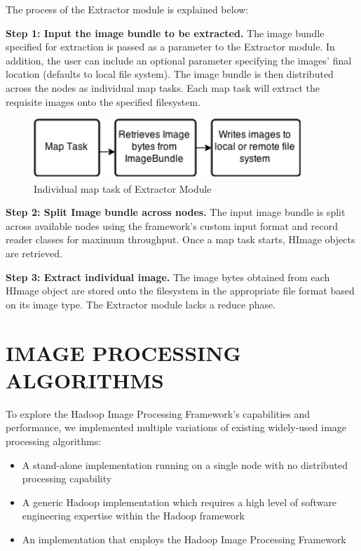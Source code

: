 \documentclass{osuthesis}
\begin{document}
				The process of the Extractor module is explained below:
				
				\textbf{Step 1: Input the image bundle to be extracted.} The image
				bundle specified for extraction is passed as a parameter to the
				Extractor module.  In addition, the user can include an optional
				parameter specifying the images' final location (defaults to local
				file system).  The image bundle is then distributed across the nodes
				as individual map tasks. Each map task will extract the requisite
				images onto the specified filesystem.
				
				\begin{figure}[h]
					\centering
					\includegraphics[width=0.90\textwidth]{ext-map}
					\caption{Individual map task of Extractor Module}
					\label{fig:ext-map}
				\end{figure}
				
				\textbf{Step 2: Split Image bundle across nodes.} The input image
				bundle is split across available nodes using the framework's custom
				input format and record reader classes for maximum throughput. Once a
				map task starts, HImage objects are retrieved.
				
				\textbf{Step 3: Extract individual image.} The image bytes obtained
				from each HImage object are stored onto the filesystem in the
				appropriate file format based on its image type.  The Extractor module
				lacks a reduce phase.
				
				
				
				\chapter{IMAGE PROCESSING ALGORITHMS}
				\label{algorithms}
				To explore the Hadoop Image Processing Framework's capabilities and
				performance, we implemented multiple variations of existing
				widely-used image processing algorithms:
				\begin{itemize}
					\item A stand-alone implementation running on a single node with no
					distributed processing capability
					\item A generic Hadoop implementation which requires a high level of
					software engineering expertise within the Hadoop framework
					\item An implementation that employs the Hadoop Image Processing
					Framework
					\end{itemize}
					
\end{document}
